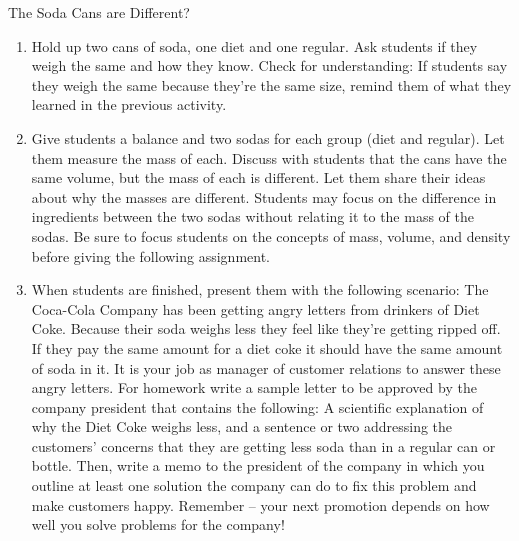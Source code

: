 {\begin{act}The Soda Cans are Different?\end{act}
\begin{enumerate}
\item Hold up two cans of soda, one diet and one regular. Ask students if they weigh the same and how they know. Check for understanding: If students say they weigh the same because they're the same size, remind them of what they learned in the previous activity. 
\item Give students a balance and two sodas for each group (diet and regular). Let them measure the mass of each. Discuss with students that the cans have the same volume, but the mass of each is different. Let them share their ideas about why the masses are different. Students may focus on the difference in ingredients between the two sodas without relating it to the mass of the sodas. Be sure to focus students on the concepts of mass, volume, and density before giving the following assignment.
\item When students are finished, present them with the following scenario: The Coca-Cola Company has been getting angry letters from drinkers of Diet Coke. Because their soda weighs less they feel like they're getting ripped off. If they pay the same amount for a diet coke it should have the same amount of soda in it. It is your job as manager of customer relations to answer these angry letters. For homework write a sample letter to be approved by the company president that contains the following: A scientific explanation of why the Diet Coke weighs less, and a sentence or two addressing the customers' concerns that they are getting less soda than in a regular can or bottle. Then, write a memo to the president of the company in which you outline at least one solution the company can do to fix this problem and make customers happy. Remember -- your next promotion depends on how well you solve problems for the company!
\end{enumerate}
} %

